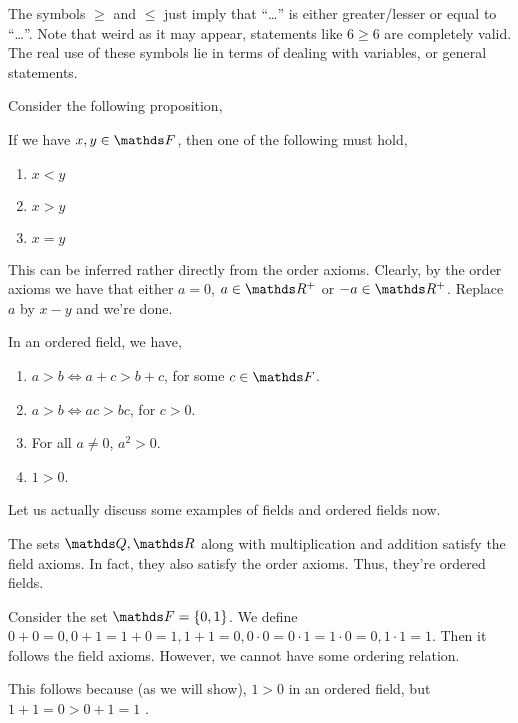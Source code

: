The symbols \(\ge\) and \(\le\) just imply that ``\dots'' is either greater/lesser or equal to ``\dots''.
Note that weird as it may appear, statements like \(6 \ge 6\) are completely valid. 
The real use of these symbols lie in terms of dealing with variables, or general 
statements.

Consider the following proposition, 

\begin{plainprop}[Trichotomy]
    If we have \(x, y \in \FF\), then one of the following must hold, 
    \begin{enumerate}
        \item \(x < y\)
        \item \(x > y\)
        \item \(x = y\)
    \end{enumerate}
\end{plainprop}

This can be inferred rather directly from the order axioms. Clearly, by the order 
axioms we have that either \(a = 0\), \(a \in \RR^+\) or \(-a \in \RR^+\).
Replace \(a\) by \(x - y\) and we're done.

\begin{proposition}
    In an ordered field, we have,

    \begin{enumerate}
        \item \(a > b \iff a + c > b + c\), for some \(c \in \FF\).
        \item \(a > b \iff ac > bc\), for \(c > 0\).
        \item For all \(a \ne 0\), \(a^2 > 0\).
        \item \(1 > 0\).
    \end{enumerate}
\end{proposition}



Let us actually discuss some examples of fields and ordered fields now.

\begin{example}
    The sets \(\QQ, \RR\) along with multiplication and addition satisfy the field axioms. 
    In fact, they also satisfy the order axioms. Thus, they're ordered fields. 
\end{example}

\begin{example}
    Consider the set \(\FF = \Set{0, 1}\). We define \(0 + 0 = 0, 0 + 1 = 1 + 0 = 1, 1 + 1 = 0, 0 \cdot 0 = 0 \cdot 1 = 1 \cdot 0 = 0, 1 \cdot 1 = 1\).
    Then it follows the field axioms. However, we cannot have some ordering relation.
    
    This follows because (as we will show), \(1 > 0\) in an ordered field, but \(1 + 1 = 0 > 0 + 1 = 1\) \lightning.
\end{example}

